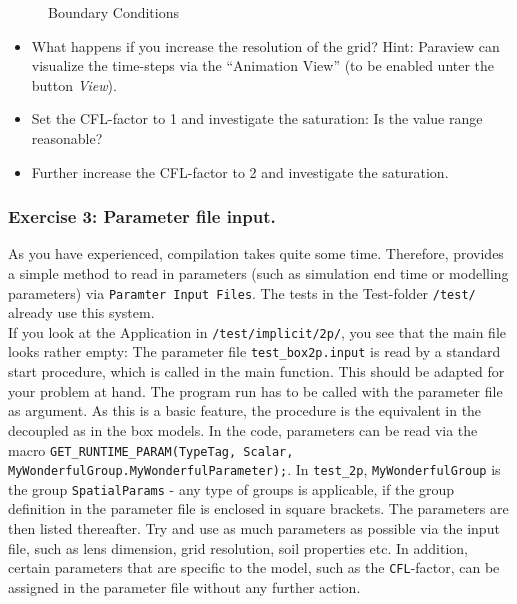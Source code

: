 \begin{figure}[ht]
\centering
{}
\caption{Boundary Conditions}\label{tutorial-decoupled:ex2_BC}
\end{figure}

\begin{itemize}
 \item What happens if you increase the resolution of the grid? Hint: Paraview can visualize the time-steps via the ``Animation View'' (to be enabled unter the button \textit{View}).
 \item Set the CFL-factor to 1 and investigate the saturation: Is the value range reasonable?
 \item Further increase the CFL-factor to 2 and investigate the saturation.
\end{itemize}

\subsubsection{Exercise 3: Parameter file input.}
As you have experienced, compilation takes quite some time. Therefore, \Dumux provides a simple method to read in parameters (such as simulation end time or modelling parameters) via \texttt{Paramter Input Files}. The tests in the Test-folder \texttt{/test/} already use this system.\\
If you look at the Application in \texttt{/test/implicit/2p/}, you see that the main file looks rather empty: The parameter file \texttt{test\_box2p.input} is read by a standard start procedure, which is called in the main function. This should be adapted for your problem at hand. The program run has to be called with the parameter file as argument. As this is a basic \Dumux feature, the procedure is the equivalent in the decoupled as in the box models.
In the code, parameters can be read via the macro \texttt{GET\_RUNTIME\_PARAM(TypeTag, Scalar, MyWonderfulGroup.MyWonderfulParameter);}. In \texttt{test\_2p}, \texttt{MyWonderfulGroup} is the group \texttt{SpatialParams} - any type of groups is applicable, if the group definition in the parameter file is enclosed in square brackets. The parameters are then listed thereafter. Try and use as much parameters as possible via the input file, such as lens dimension, grid resolution, soil properties etc. In addition, certain parameters that are specific to the model, such as the \texttt{CFL}-factor, can be assigned in the parameter file without any further action.

